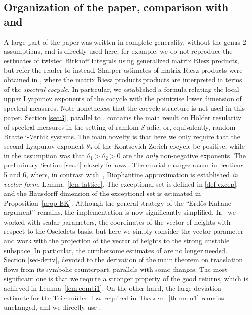 \subsection{Organization of the paper, comparison with \cite{BuSo18a} and \cite{BuSo19}} A large part of the paper \cite{BuSo18a} was written in complete generality, without the genus 2 assumptions, and is directly used here; for
example, we do not reproduce the estimates of twisted Birkhoff integrals using generalized matrix Riesz products, but refer the reader to \cite[\S3]{BuSo18a} instead.
Sharper estimates of matrix Riesz products were obtained in \cite{BuSo19}, where the matrix Riesz products products are interpreted in terms of the \emph{spectral cocycle}. In particular, we established a formula relating the local upper Lyapunov exponents of the cocycle with the pointwise lower dimension of spectral measures. Note nonetheless that the cocycle structure is not used in this paper.
Section \ref{sec:3}, parallel to \cite[\S4]{BuSo18a}, contains the main result on Hölder regularity of spectral measures in the setting of random $S$-adic, or, equivalently, random Bratteli-Verhik systems.
The main novelty is that here we only require that the second Lyapunov exponent $\theta_2$ of the
Kontsevich-Zorich cocycle be positive, while in \cite{BuSo18a} the assumption was that $\theta_1 > \theta_2 >0$ are the \emph{only} non-negative exponents.
The preliminary Section \ref{sec:4} closely follows \cite{BuSo18a}.
The crucial changes occur in Sections 5 and 6, where, in contrast with~\cite{BuSo18a}, Diophantine approximation is established {\it in vector form}, \cf Lemma~\ref{lem-lattice}. The exceptional set is defined in \eqref{def-excep}, and the Hausdorff dimension of the exceptional set is estimated in Proposition~\ref{prop-EK}. Although the general strategy of the ``Erd\H{o}s-Kahane argu\-ment'' remains, the implementation is now significantly simplified. In~\cite{BuSo18a} we worked with scalar parameters, the coordinates of the vector of heights with respect to the \hbox{Oseledets} \hbox{basis}, but here we simply consider the vector parameter and work with the projection of the vector of heights to the strong unstable subspace.
In particular, the cumbersome estimates of \cite[\S8]{BuSo18a} are no longer needed.
Section \ref{sec-deriv}, devoted to the derivation of the main theorem on translation flows from its symbolic counterpart, parallels \cite[\S11]{BuSo18a} with some changes. The most significant one is that we require a stronger property of the good returns, which is achieved in Lemma~\ref{lem-combi1}. On the other hand, the large deviation estimate for the Teichmüller flow required in Theorem~\ref{th-main1} remains unchanged, and we directly use \cite[Prop.\,11.3]{BuSo18a}.\enlargethispage{.5\baselineskip}%

